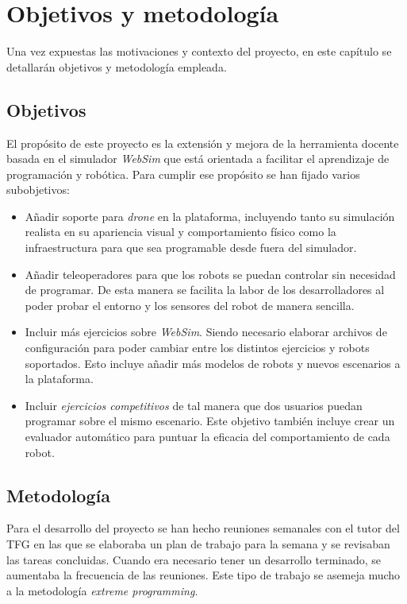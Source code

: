 \chapter{Objetivos y metodología}
Una vez expuestas las motivaciones y contexto del proyecto, en este capítulo se detallarán objetivos y metodología empleada. 

\label{chap:objetivos}
\section{Objetivos}
El propósito de este proyecto es la extensión y mejora de la herramienta docente basada en el simulador \textit{WebSim} que está orientada a facilitar el aprendizaje de programación y robótica. Para cumplir ese propósito se han fijado varios subobjetivos:
\begin{itemize}
    \item Añadir soporte para \textit{drone} en la plataforma, incluyendo tanto su simulación realista en su apariencia visual y comportamiento físico como la infraestructura para que sea programable desde fuera del simulador.
        
    \item Añadir teleoperadores para que los robots se puedan controlar sin necesidad de programar. De esta manera se facilita la labor de los desarrolladores al poder probar el entorno y los sensores del robot de manera sencilla.
    
    \item Incluir más ejercicios sobre \textit{WebSim}. Siendo necesario elaborar archivos de configuración para poder cambiar entre los distintos ejercicios y robots soportados. Esto incluye añadir más modelos de robots y nuevos escenarios a la plataforma.

    \item Incluir \textit{ejercicios competitivos} de tal manera que dos usuarios puedan programar sobre el mismo escenario. Este objetivo también incluye crear un evaluador automático para puntuar la eficacia del comportamiento de cada robot. 
    
\end{itemize}
\section{Metodología}
\label{sec:metodologia}

Para el desarrollo del proyecto se han hecho reuniones semanales con el tutor del TFG en las que se elaboraba un plan de trabajo para la semana y se revisaban las tareas concluidas. Cuando era necesario tener un desarrollo terminado, se aumentaba la frecuencia de las reuniones. Este tipo de trabajo se asemeja mucho a la metodología \textit{extreme programming}. \newline

